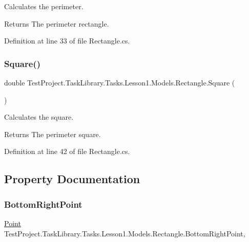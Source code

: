 Calculates the perimeter. 

\begin{DoxyReturn}{Returns}
The perimeter rectangle.
\end{DoxyReturn}


Definition at line 33 of file Rectangle.\+cs.

\mbox{\label{class_test_project_1_1_task_library_1_1_tasks_1_1_lesson1_1_1_models_1_1_rectangle_ae1afd74cf0e8bc3f7190ce37da10b943}} 
\subsubsection{\texorpdfstring{Square()}{Square()}}
{\footnotesize\ttfamily double Test\+Project.\+Task\+Library.\+Tasks.\+Lesson1.\+Models.\+Rectangle.\+Square (\begin{DoxyParamCaption}{ }\end{DoxyParamCaption})}



Calculates the square. 

\begin{DoxyReturn}{Returns}
The perimeter square.
\end{DoxyReturn}


Definition at line 42 of file Rectangle.\+cs.



\subsection{Property Documentation}
\mbox{\label{class_test_project_1_1_task_library_1_1_tasks_1_1_lesson1_1_1_models_1_1_rectangle_a29e0d53ddc16899df3351aeed09a4899}} 
\subsubsection{\texorpdfstring{BottomRightPoint}{BottomRightPoint}}
{\footnotesize\ttfamily \mbox{\hyperlink{class_test_project_1_1_task_library_1_1_tasks_1_1_lesson1_1_1_models_1_1_point}{Point}} Test\+Project.\+Task\+Library.\+Tasks.\+Lesson1.\+Models.\+Rectangle.\+Bottom\+Right\+Point\hspace{0.3cm}{\ttfamily [get]}, {\ttfamily [set]}}



